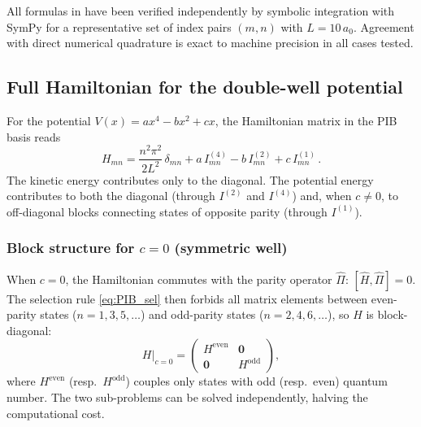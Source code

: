 \begin{remark}
All formulas in  have been verified
independently by symbolic integration with SymPy for a representative set of
index pairs $(m,n)$ with $L = 10\,a_0$.  Agreement with direct numerical
quadrature is exact to machine precision in all cases tested.
\end{remark}

\subsection{Full Hamiltonian for the double-well potential}\label{sec:PIB_H}

For the potential $V(x) = ax^4 - bx^2 + cx$, the Hamiltonian matrix in the
PIB basis reads
\begin{equation}\label{eq:PIB_H}
  \boxed{H_{mn} = \frac{n^2\pi^2}{2L^2}\,\delta_{mn}
    + a\,I_{mn}^{(4)} - b\,I_{mn}^{(2)} + c\,I_{mn}^{(1)}\,.}
\end{equation}
The kinetic energy contributes only to the diagonal.  The potential energy
contributes to both the diagonal (through $I^{(2)}$ and $I^{(4)}$) and, when
$c \neq 0$, to off-diagonal blocks connecting states of opposite parity
(through $I^{(1)}$).

\subsubsection{Block structure for $c = 0$ (symmetric well)}

When $c = 0$, the Hamiltonian commutes with the parity operator $\hat{\Pi}$:
$[\hat{H}, \hat{\Pi}] = 0$.  The selection rule \cref{eq:PIB_sel} then
forbids all matrix elements between even-parity states ($n = 1, 3, 5, \ldots$)
and odd-parity states ($n = 2, 4, 6, \ldots$), so $H$ is block-diagonal:
\begin{equation}\label{eq:PIB_block_sym}
  H\big|_{c=0} =
  \begin{pmatrix}
    H^{\text{even}} & \mathbf{0} \\
    \mathbf{0} & H^{\text{odd}}
  \end{pmatrix}\!,
\end{equation}
where $H^{\text{even}}$ (resp.\ $H^{\text{odd}}$) couples only states with
odd (resp.\ even) quantum number.  The two sub-problems can be solved
independently, halving the computational cost.

